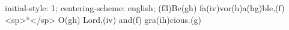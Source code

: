 initial-style: 1;
centering-scheme: english;
(f3)Be(gh) fa(iv)vor(h)a(hg)ble,(f) <sp>*</sp> O(gh) Lord,(iv) and(f) gra(ih)cious.(g)

